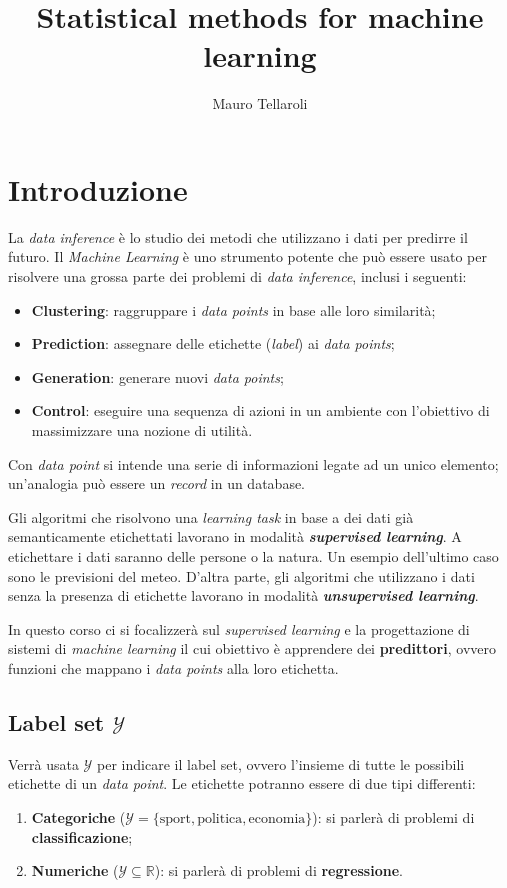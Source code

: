 \documentclass[a4paper]{article}
\newcommand{\Y}{\ensuremath{\mathcal{Y}}}
\begin{document}
\title{Statistical methods for machine learning}
\author{Mauro Tellaroli}
\date{}
\maketitle

\section{Introduzione}

La \textit{data inference} è lo studio dei metodi che utilizzano i dati per predirre il futuro. 
Il \textit{Machine Learning} è uno strumento potente che può essere usato per risolvere una 
grossa parte dei problemi di \textit{data inference}, inclusi i seguenti:
\begin{itemize}
    \item \textbf{Clustering}: raggruppare i \textit{data points} in base alle loro similarità;
    \item \textbf{Prediction}: assegnare delle etichette (\textit{label}) ai \textit{data points};
    \item \textbf{Generation}: generare nuovi \textit{data points};
    \item    \textbf{Control}: eseguire una sequenza di azioni in un ambiente con l'obiettivo di
                               massimizzare una nozione di utilità.
\end{itemize}

Con \textit{data point} si intende una serie di informazioni legate ad un unico elemento;
un'analogia può essere un \textit{record} in un database.

Gli algoritmi che risolvono una \textit{learning task} in base a dei dati già semanticamente
etichettati lavorano in modalità \textbf{\textit{supervised learning}}. A etichettare i dati
saranno delle persone o la natura. Un esempio dell'ultimo caso sono le previsioni del meteo. 
D'altra parte, gli algoritmi che utilizzano i dati senza la presenza di etichette lavorano in
modalità \textbf{\textit{unsupervised learning}}.

In questo corso ci si focalizzerà sul \textit{supervised learning} e la progettazione di 
sistemi di \textit{machine learning} il cui obiettivo è apprendere dei 
\textbf{predittori}, ovvero funzioni che mappano i \textit{data points} alla loro
etichetta.

\subsection*{Label set $\Y$}
Verrà usata $\Y$ per indicare il label set, ovvero l'insieme di tutte le possibili
etichette di un \textit{data point}. Le etichette potranno essere di due tipi differenti:
\begin{enumerate}
    \item \textbf{Categoriche} ($\Y = \{ \text{sport},\text{politica},\text{economia}\}$):
        si parlerà di problemi di \textbf{classificazione};
    \item \textbf{Numeriche} ($\Y \subseteq \mathbb{R} $): 
        si parlerà di problemi di \textbf{regressione}.
\end{enumerate}
\end{document}
